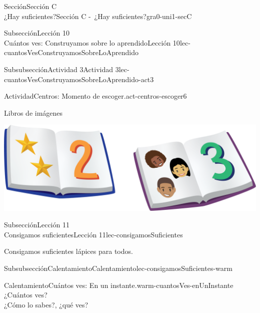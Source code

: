 \begin{sectionptx}{Sección}{{\Large Sección C\\}¿Hay suficientes?}{}{Sección C -~¿Hay suficientes?}{}{}{gra0-uni1-secC}
\begin{subsectionptx}{Subsección}{{\normalsize Lección 10\\[-0.05cm]}Cuántos ves: Construyamos sobre lo aprendido}{}{Lección 10}{}{}{lec-cuantosVesConstruyamosSobreLoAprendido}
\begin{subsubsectionptx}{Subsubsección}{Actividad 3}{}{Actividad 3}{}{}{lec-cuantosVesConstruyamosSobreLoAprendido-act3}
\begin{activity}{Actividad}{Centros: Momento de escoger.}{act-centros-escoger6}
\begin{sidebyside}{2}{0.025}{0.025}{0.05}
\begin{sbspanel}{0.45}
\end{sbspanel}%
\begin{sbspanel}{0.45}%
Libros de imágenes%
\par
\includegraphics[max width=\linewidth, center]{external/png-source/K.1.D Beta Student Workbooks.Books.png}
\end{sbspanel}%
\end{sidebyside}%
\end{activity}%
\end{subsubsectionptx}
\end{subsectionptx}
%
%
\typeout{************************************************}
\typeout{************************************************}
%
\begin{subsectionptx}{Subsección}{{\normalsize Lección 11\\[-0.05cm]}Consigamos suficientes}{}{Lección 11}{}{}{lec-consigamosSuficientes}
\begin{introduction}{}%
Consigamos suficientes lápices para todos.%
\end{introduction}%
%
%
\typeout{************************************************}
\typeout{************************************************}
%
\begin{subsubsectionptx}{Subsubsección}{Calentamiento}{}{Calentamiento}{}{}{lec-consigamosSuficientes-warm}
\begin{exploration}{Calentamiento}{Cuántos ves: En un instante.}{warm-cuantosVes-enUnInstante}%
¿Cuántos ves?\\
 ¿Cómo lo sabes?, ¿qué ves?%
\begin{sidebyside}{2}{0}{0}{0}%
\begin{sbspanel}{0.5}%

\end{sbspanel}
\end{sidebyside}
\end{exploration}
\end{subsubsectionptx}
\end{subsectionptx}
\end{sectionptx}
